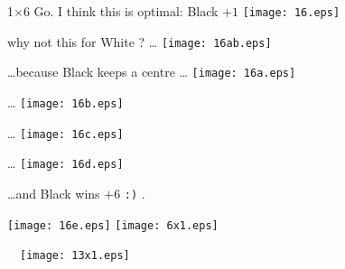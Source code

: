 \documentclass[12pt]{article}
\begin{document}
1$\times$6 Go.  I think this is optimal: Black $+1$
\hfill\texttt{[image: 16.eps]}
\vspace*{1cm}~
\vspace*{1cm}

why not this for White ? \ldots
\hfill\texttt{[image: 16ab.eps]}
\vspace*{1cm}~
\vspace*{1cm}

\ldots because Black keeps a centre \ldots
\hfill\texttt{[image: 16a.eps]}
\vspace*{1cm}

\ldots
\hfill\texttt{[image: 16b.eps]}
\vspace*{1cm}

\ldots 
\hfill\texttt{[image: 16c.eps]}
\vspace*{1cm}

\ldots 
\hfill\texttt{[image: 16d.eps]}
\vspace*{1cm} 

\ldots and Black wins $+6$ \verb+:)+ .

\hfill\texttt{[image: 16e.eps]}
\vspace*{1cm}
\newpage
\hfill\texttt{[image: 6x1.eps]}\hfill~\hfill~\hfill~

\vspace*{-13.6cm}\hfill~\hfill~\hfill\texttt{[image: 13x1.eps]}\hfill~
\end{document}
